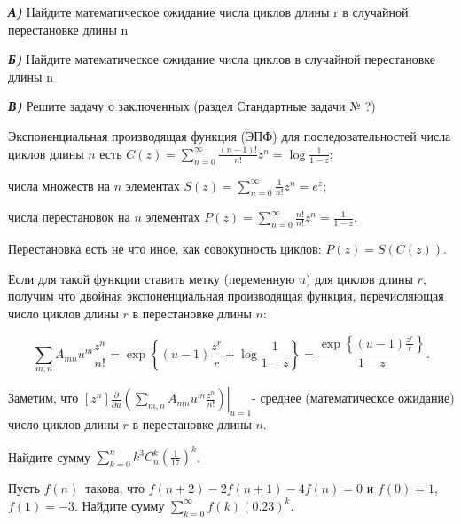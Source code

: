 \begin{problem}

\textbf{\textit{А)}} Найдите математическое ожидание числа циклов длины r в 
случайной перестановке длины n

\textbf{\textit{Б)}} Найдите математическое ожидание числа циклов в 
случайной перестановке длины n 

\textbf{\textit{В)}} Решите задачу о заключенных (раздел Стандартные задачи № ?)

\end{problem}

\begin{ordre}
 Экспоненциальная производящая функция (ЭПФ) для последовательностей числа циклов длины $n$ есть $C(z)=\sum _{n=0}^{\infty }\frac{(n-1)!}{n!} z^{n}  =\log \frac{1}{1-z} $;

числа множеств на $n$ элементах $S(z)=\sum _{n=0}^{\infty }\frac{1}{n!} z^{n}  =e^{z} $;

числа перестановок на $n$ элементах $P(z)=\sum _{n=0}^{\infty }\frac{n!}{n!} z^{n}  =\frac{1}{1-z} $.

Перестановка есть не что иное, как совокупность циклов: $P(z)=S\left(C(z)\right)$.

Если для такой функции ставить метку (переменную $u$) для циклов длины $r$, получим что двойная экспоненциальная производящая функция, перечисляющая число циклов длины $r$ в перестановке длины $n$:

\[\sum _{m,n}^{}A_{mn} u^{m}  \frac{z^{n} }{n!} =\exp \left\{(u-1)\frac{z^{r} }{r} +\log \frac{1}{1-z} \right\}=\frac{\exp \left\{(u-1)\frac{z^{r} }{r} \right\}}{1-z} .\] 

Заметим, что $\left[z^{n} \right]\left. \frac{\partial }{\partial u} \left(\sum _{m,n}^{}A_{mn} u^{m}  \frac{z^{n} }{n!} \right)\right|_{u=1} $- среднее (математическое ожидание) число циклов длины $r$ в перестановке длины $n$.
\end{ordre}

\begin{problem}
Найдите сумму $\sum\limits_{k=0}^n k^3 C_n^k \left(\frac{1}{17}\right)^k$.
\end{problem}

\begin{problem}
Пусть $f(n)$~такова, что $ f(n+2) - 2f(n+1) - 4f(n) = 0 $ и $ f(0) = 1 $, $ f(1) = -3 $. Найдите сумму $ \sum\limits_{k=0}^{\infty} f(k) (0.23)^k $.
\end{problem}


